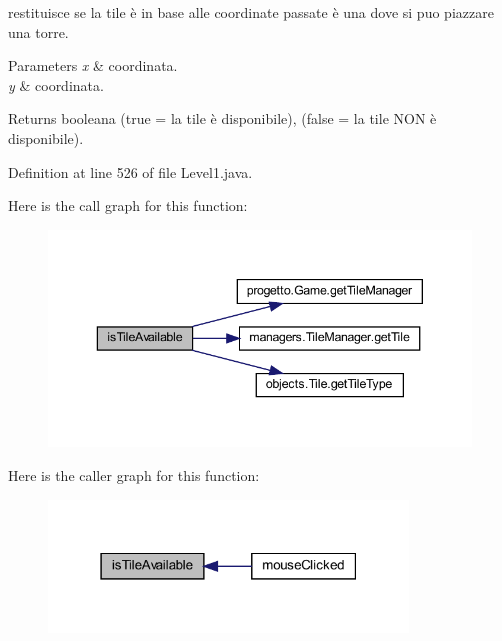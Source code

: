 restituisce se la tile è in base alle coordinate passate è una dove si puo piazzare una torre. 


\begin{DoxyParams}{Parameters}
{\em x} & coordinata. \\
\hline
{\em y} & coordinata.\\
\hline
\end{DoxyParams}
\begin{DoxyReturn}{Returns}
booleana (true = la tile è disponibile), (false = la tile N\+ON è disponibile). 
\end{DoxyReturn}


Definition at line 526 of file Level1.\+java.

Here is the call graph for this function\+:
\nopagebreak
\begin{figure}[H]
\begin{center}
\leavevmode
\includegraphics[width=343pt]{classscenes_1_1_level1_aaeac2ee6b3a920a21928ee7b3dc8e7a9_cgraph}
\end{center}
\end{figure}
Here is the caller graph for this function\+:\nopagebreak
\begin{figure}[H]
\begin{center}
\leavevmode
\includegraphics[width=271pt]{classscenes_1_1_level1_aaeac2ee6b3a920a21928ee7b3dc8e7a9_icgraph}
\end{center}
\end{figure}
\mbox{\label{classscenes_1_1_level1_ab68417e6738c05037923f5f0f21eb586}} 
